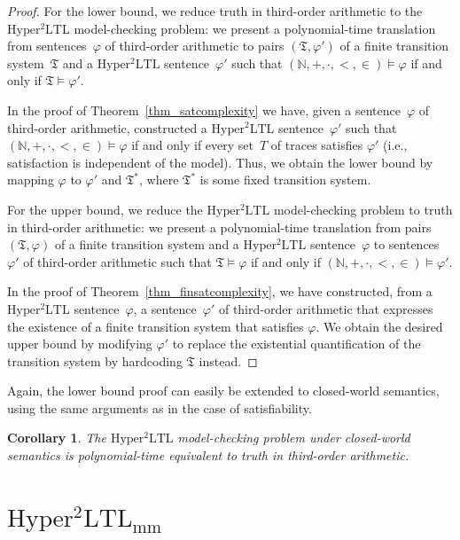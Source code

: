 \documentclass[dvipsnames,10pt,a4paper]{amsart}
\newtheorem{cor}[thm]{Corollary}
\theoremstyle{definition}
\theoremstyle{remark}
\newcommand{\nats}{\mathbb{N}}
\renewcommand{\phi}{\varphi}
\newcommand{\sohyltl}{\mathrm{Hyper^2LTL}\xspace}
\newcommand{\sohyltlfp}{\mathrm{Hyper^2LTL_{\mathrm{mm}}}\xspace}
\newcommand{\tsys}{\mathfrak{T}}
\newcommand{\natsstruct}{(\nats, +, \cdot, <, \in)}
\begin{document}
\begin{proof}
For the lower bound, we reduce truth in third-order arithmetic to the $\sohyltl$ model-checking problem: we present a polynomial-time translation from sentences~$\phi$ of third-order arithmetic to pairs $(\tsys, \phi')$ of a finite transition system~$\tsys$ and a $\sohyltl$ sentence~$\phi'$ such that $\natsstruct \models \phi$ if and only if $\tsys \models \phi'$.

In the proof of Theorem~\ref{thm_satcomplexity} we have, given a sentence~$\phi$ of third-order arithmetic, constructed a $\sohyltl$ sentence~$\phi'$ such that $\natsstruct\models \phi$ if and only if every set~$T$ of traces satisfies $\phi'$ (i.e., satisfaction is independent of the model). 
Thus, we obtain the lower bound by mapping $\phi$ to $\phi'$ and $\tsys^*$, where $\tsys^*$ is some fixed transition system.

For the upper bound, we reduce the $\sohyltl$ model-checking problem to truth in third-order arithmetic: we present a polynomial-time translation from pairs~$(\tsys, \phi)$ of a finite transition system and a $\sohyltl$ sentence~$\phi$ to sentences~$\phi'$ of third-order arithmetic such that $\tsys \models \phi$ if and only if $\natsstruct \models \phi'$.

In the proof of Theorem~\ref{thm_finsatcomplexity}, we have constructed, from a $\sohyltl$ sentence~$\phi$, a sentence~$\phi'$ of third-order arithmetic that expresses the existence of a finite transition system that satisfies $\phi$. 
We obtain the desired upper bound by modifying $\phi'$ to replace the existential quantification of the transition system by hardcoding $\tsys$ instead.
\end{proof}


Again, the lower bound proof can easily be extended to closed-world semantics, using the same arguments as in the case of satisfiability.

\begin{cor}
\label{cor_mccomplexity}
The $\sohyltl$ model-checking problem under closed-world semantics is polynomial-time equivalent to truth in third-order arithmetic.
\end{cor}


\section{\texorpdfstring{$\sohyltlfp$}{Second-order HyperLTL with Minimality/Maximality Constraints}} 
\label{sec_mm}
\end{document}

